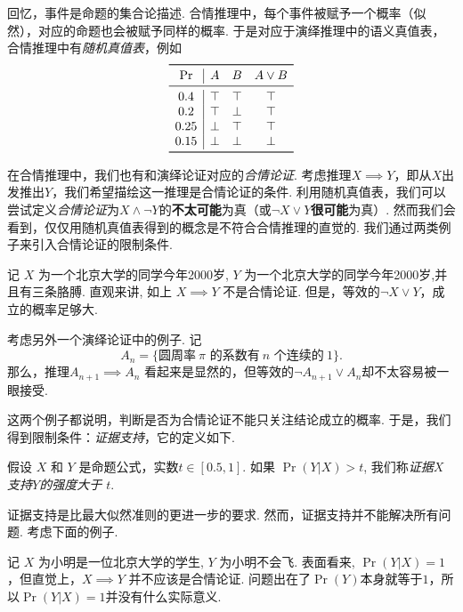 回忆，事件是命题的集合论描述. 合情推理中，每个事件被赋予一个概率（似然），对应的命题也会被赋予同样的概率. 于是对应于演绎推理中的语义真值表，合情推理中有\textit{随机真值表}，例如
\[
\begin{array}{c|ccc}
    \toprule
    \Pr & A & B & A\vee B \\ \midrule
    0.4 & \T & \T & \T \\ 
    0.2 & \T & \F & \T \\ 
    0.25 & \F & \T & \T \\
    0.15 & \F & \F & \F \\
    \bottomrule
\end{array}
\]

在合情推理中，我们也有和演绎论证对应的\textit{合情论证}. 考虑推理$X\implies Y$，即从$X$出发推出$Y$，我们希望描绘这一推理是合情论证的条件. 利用随机真值表，我们可以尝试定义\textit{合情论证}为$X\wedge\neg Y$的\textbf{不太可能}为真（或$\neg X\vee Y$\textbf{很可能}为真）. 然而我们会看到，仅仅用随机真值表得到的概念是不符合合情推理的直觉的. 我们通过两类例子来引入合情论证的限制条件.



\begin{example}[奇怪的例子一]
记 $X$ 为一个北京大学的同学今年2000岁, $Y$ 为一个北京大学的同学今年2000岁,并且有三条胳膊. 直观来讲, 如上 $X\implies Y$ 不是合情论证. 但是，等效的$\neg X\vee Y$，成立的概率足够大.

考虑另外一个演绎论证中的例子. 记
\[A_n=\{\text{圆周率}~\pi\text{ 的系数有}~n\text{ 个连续的}~1\}.\]
那么，推理$A_{n+1} \implies A_n$ 看起来是显然的，但等效的$\neg A_{n+1} \vee A_n$却不太容易被一眼接受.
\end{example}
这两个例子都说明，判断是否为合情论证不能只关注结论成立的概率. 于是，我们得到限制条件：\textit{证据支持}，它的定义如下. 
\begin{definition}[证据支持]
    假设 $X$ 和 $Y$ 是命题公式，实数$t\in [0.5, 1]$. 如果 $\Pr(Y|X)>t$, 我们称\textit{证据$X$支持$Y$的强度大于 $t$}. 
\end{definition}

证据支持是比最大似然准则的更进一步的要求. 然而，证据支持并不能解决所有问题. 考虑下面的例子.

\begin{example}[奇怪的例子二]
记 $X$ 为小明是一位北京大学的学生, $Y$ 为小明不会飞. 表面看来, $\Pr(Y|X)=1$，但直觉上，$X\implies Y$ 并不应该是合情论证. 问题出在了$\Pr(Y)$本身就等于$1$，所以$\Pr(Y|X)=1$并没有什么实际意义.
\end{example}

